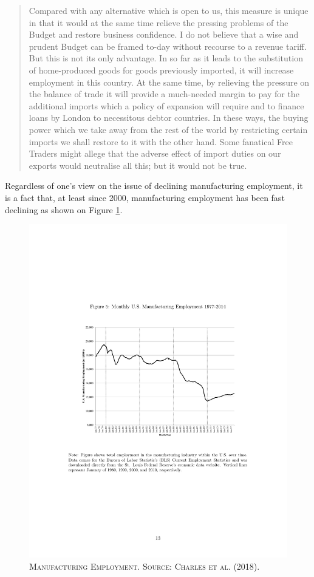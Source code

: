 \documentclass[]{book}
\begin{document}
\begin{quote}
Compared with any alternative which is open to us, this measure is
unique in that it would at the same time relieve the pressing problems
of the Budget and restore business confidence. I do not believe that a
wise and prudent Budget can be framed to-day without recourse to a
revenue tariff. But this is not its only advantage. In so far as it
leads to the substitution of home-produced goods for goods previously
imported, it will increase employment in this country. At the same time,
by relieving the pressure on the balance of trade it will provide a
much-needed margin to pay for the additional imports which a policy of
expansion will require and to finance loans by London to necessitous
debtor countries. In these ways, the buying power which we take away
from the rest of the world by restricting certain imports we shall
restore to it with the other hand. Some fanatical Free Traders might
allege that the adverse effect of import duties on our exports would
neutralise all this; but it would not be true.
\end{quote}

Regardless of one's view on the issue of declining manufacturing
employment, it is a fact that, at least since 2000, manufacturing
employment has been fast declining as shown on Figure
\ref{fig:CharlesHurstSchwartz2018-fig5}.




\begin{figure}

{\centering \includegraphics[width=0.8\linewidth,height=0.8\textheight]{figures/CharlesHurstSchwartz2018/fig5} 

}

\caption{\textsc{Manufacturing Employment.
Source: Charles et al. (2018).}}\label{fig:CharlesHurstSchwartz2018-fig5}
\end{figure}
\end{document}
